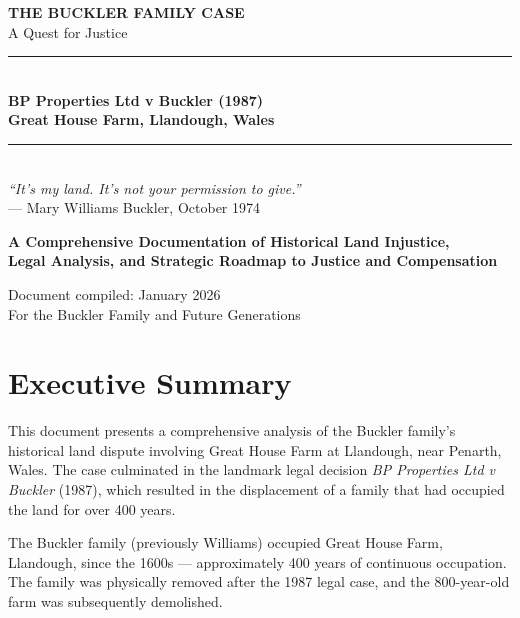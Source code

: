 \documentclass[11pt,a4paper]{article}
\begin{document}
\begin{titlepage}
\centering
\vspace*{2cm}

{\Huge\bfseries\color{darkblue} THE BUCKLER FAMILY CASE}\\[0.5cm]
{\LARGE\color{burgundy} A Quest for Justice}\\[1cm]

\rule{\textwidth}{1.5pt}\\[0.5cm]
{\Large\bfseries BP Properties Ltd v Buckler (1987)\\
Great House Farm, Llandough, Wales}\\[0.5cm]
\rule{\textwidth}{1.5pt}\\[2cm]

{\large\itshape ``It's my land. It's not your permission to give.''}\\[0.3cm]
{\normalsize --- Mary Williams Buckler, October 1974}\\[2cm]

\begin{tcolorbox}[colback=lightgray,colframe=darkblue,width=0.9\textwidth]
\centering
\textbf{A Comprehensive Documentation of Historical Land Injustice,\\Legal Analysis, and Strategic Roadmap to Justice and Compensation}
\end{tcolorbox}

\vfill

{\large Document compiled: January 2026}\\[0.5cm]
{\normalsize For the Buckler Family and Future Generations}

\end{titlepage}

\tableofcontents
\newpage

\section{Executive Summary}

This document presents a comprehensive analysis of the Buckler family's historical land dispute involving Great House Farm at Llandough, near Penarth, Wales. The case culminated in the landmark legal decision \textit{BP Properties Ltd v Buckler} (1987), which resulted in the displacement of a family that had occupied the land for over 400 years.

\begin{keyfact}
The Buckler family (previously Williams) occupied Great House Farm, Llandough, since the 1600s --- approximately 400 years of continuous occupation. The family was physically removed after the 1987 legal case, and the 800-year-old farm was subsequently demolished.
\end{keyfact}
\end{document}
